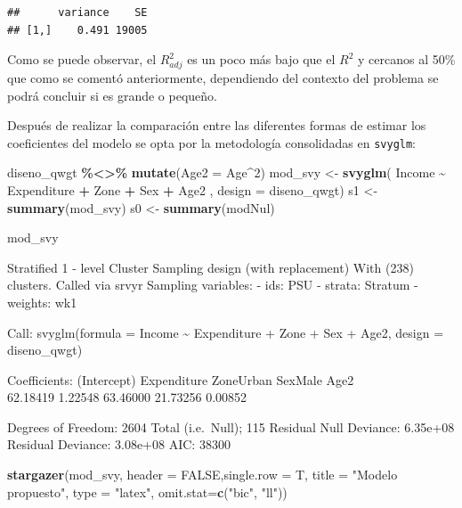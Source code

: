 \documentclass[
  spanish,
  12pt,
]{book}
\newenvironment{Shaded}{\begin{snugshade}}{\end{snugshade}}
\newcommand{\AttributeTok}[1]{\textcolor[rgb]{0.13,0.29,0.53}{#1}}
\newcommand{\ConstantTok}[1]{\textcolor[rgb]{0.56,0.35,0.01}{#1}}
\newcommand{\DecValTok}[1]{\textcolor[rgb]{0.00,0.00,0.81}{#1}}
\newcommand{\FunctionTok}[1]{\textcolor[rgb]{0.13,0.29,0.53}{\textbf{#1}}}
\newcommand{\NormalTok}[1]{#1}
\newcommand{\OtherTok}[1]{\textcolor[rgb]{0.56,0.35,0.01}{#1}}
\newcommand{\SpecialCharTok}[1]{\textcolor[rgb]{0.81,0.36,0.00}{\textbf{#1}}}
\newcommand{\StringTok}[1]{\textcolor[rgb]{0.31,0.60,0.02}{#1}}
\begin{document}
\begin{verbatim}
##      variance    SE
## [1,]    0.491 19005
\end{verbatim}

Como se puede observar, el \(R_{adj}^{2}\) es un poco más bajo que el \(R^{2}\) y cercanos al 50\% que como se comentó anteriormente, dependiendo del contexto del problema se podrá concluir si es grande o pequeño.

Después de realizar la comparación entre las diferentes formas de estimar los coeficientes del modelo se opta por la metodología consolidadas en \texttt{svyglm}:

\begin{Shaded}
\begin{Highlighting}[]
\NormalTok{diseno\_qwgt }\SpecialCharTok{\%\textless{}\textgreater{}\%} \FunctionTok{mutate}\NormalTok{(}\AttributeTok{Age2 =}\NormalTok{ Age}\SpecialCharTok{\^{}}\DecValTok{2}\NormalTok{)}
\NormalTok{mod\_svy }\OtherTok{\textless{}{-}} \FunctionTok{svyglm}\NormalTok{( Income }\SpecialCharTok{\textasciitilde{}}\NormalTok{ Expenditure }\SpecialCharTok{+}\NormalTok{ Zone }\SpecialCharTok{+}\NormalTok{ Sex }\SpecialCharTok{+}\NormalTok{ Age2 ,}
                       \AttributeTok{design =}\NormalTok{ diseno\_qwgt)}
\NormalTok{s1 }\OtherTok{\textless{}{-}} \FunctionTok{summary}\NormalTok{(mod\_svy)}
\NormalTok{s0 }\OtherTok{\textless{}{-}} \FunctionTok{summary}\NormalTok{(modNul)}

\NormalTok{mod\_svy}
\end{Highlighting}
\end{Shaded}

Stratified 1 - level Cluster Sampling design (with replacement)
With (238) clusters.
Called via srvyr
Sampling variables:
- ids: PSU
- strata: Stratum
- weights: wk1

Call: svyglm(formula = Income \textasciitilde{} Expenditure + Zone + Sex + Age2, design = diseno\_qwgt)

Coefficients:
(Intercept) Expenditure ZoneUrban SexMale Age2\\
62.18419 1.22548 63.46000 21.73256 0.00852

Degrees of Freedom: 2604 Total (i.e.~Null); 115 Residual
Null Deviance: 6.35e+08
Residual Deviance: 3.08e+08 AIC: 38300

\begin{Shaded}
\begin{Highlighting}[]
\FunctionTok{stargazer}\NormalTok{(mod\_svy, }\AttributeTok{header =} \ConstantTok{FALSE}\NormalTok{,}\AttributeTok{single.row =}\NormalTok{ T,}
           \AttributeTok{title =} \StringTok{"Modelo propuesto"}\NormalTok{,}
           \AttributeTok{type =} \StringTok{"latex"}\NormalTok{,  }\AttributeTok{omit.stat=}\FunctionTok{c}\NormalTok{(}\StringTok{"bic"}\NormalTok{, }\StringTok{"ll"}\NormalTok{))}
\end{Highlighting}
\end{Shaded}
\end{document}
